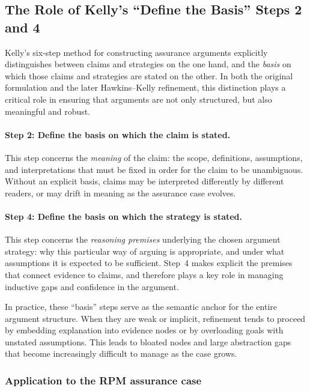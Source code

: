\documentclass{article}
\begin{document}
\subsection{The Role of Kelly’s ``Define the Basis'' Steps 2 and 4}
\label{sec:kelly-basis}

Kelly’s six-step method for constructing assurance arguments explicitly distinguishes between claims and strategies on the one hand, and the \emph{basis} on which those claims and strategies are stated on the other. In both the original formulation and the later Hawkins--Kelly refinement, this distinction plays a critical role in ensuring that arguments are not only structured, but also meaningful and robust.

\paragraph{Step 2: Define the basis on which the claim is stated.}
This step concerns the \emph{meaning} of the claim: the scope, definitions, assumptions, and interpretations that must be fixed in order for the claim to be unambiguous. Without an explicit basis, claims may be interpreted differently by different readers, or may drift in meaning as the assurance case evolves.

\paragraph{Step 4: Define the basis on which the strategy is stated.}
This step concerns the \emph{reasoning premises} underlying the chosen argument strategy: why this particular way of arguing is appropriate, and under what assumptions it is expected to be sufficient. Step~4 makes explicit the premises that connect evidence to claims, and therefore plays a key role in managing inductive gaps and confidence in the argument.

In practice, these ``basis'' steps serve as the semantic anchor for the entire argument structure. When they are weak or implicit, refinement tends to proceed by embedding explanation into evidence nodes or by overloading goals with unstated assumptions. This leads to bloated nodes and large abstraction gaps that become increasingly difficult to manage as the case grows.

\subsubsection{Application to the RPM assurance case}
\end{document}
